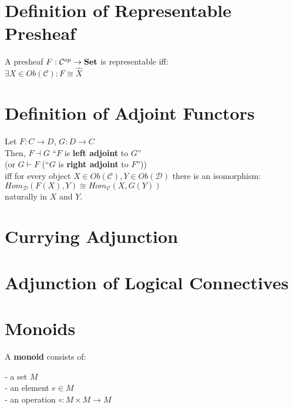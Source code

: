 \documentclass[a4paper, twoside, english, 11pt]{book}
\newcommand{\C}{\mathcal C}
\newcommand{\D}{\mathcal D}
\newcommand{\catname}[1]{{\normalfont\textbf{#1}}}
\newcommand{\Set}{\catname{Set}}
\begin{document}
\section{Definition of Representable Presheaf}

A presheaf $F : \C^{op} \rightarrow \Set$ is representable iff: \\

$\exists X \in Ob(\C) : F \cong \hat X$



\section{Definition of Adjoint Functors}

Let $F : C \rightarrow D$, $G : D \rightarrow C$ \\

\noindent
Then, $F \dashv G$ ``$F$ is \textbf{left adjoint} to $G$'' \\
(or $G \vdash F$ (``$G$ is \textbf{right adjoint} to $F$'')) \\

\noindent
iff for every object $X \in Ob(\C), Y \in Ob(\D)$ there is an isomorphism: \\

$Hom_\D(F(X), Y) \cong Hom_\C(X, G(Y))$ \\

\noindent
naturally in $X$ and $Y$.



\section{Currying Adjunction}
\section{Adjunction of Logical Connectives}



\section{Monoids}

A \textbf{monoid} consists of:

- a set $M$ \\

- an element $e \in M$ \\

- an operation $\circ : M \times M \rightarrow M$ \\
\end{document}
